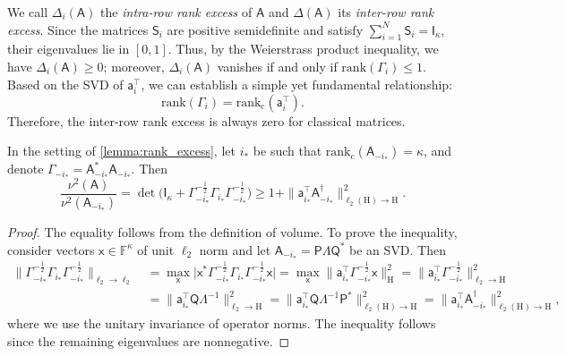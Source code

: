 \documentclass[onefignum,onetabnum]{siamart250211}
\renewenvironment{equation*}{\[}{\]\ignorespacesafterend}
\newcommand{\F}{\mathbb{F}}
\newcommand{\Hilb}{\mathrm{H}}
\newcommand{\Batrix}[1]{\bm{\Matrix{#1}}}
\newcommand{\Matrix}[1]{\mathsf{#1}}
\newcommand{\trans}{\intercal}
\newcommand{\pinv}{\dagger}
\newcommand{\rank}[2][]{\mathrm{rank} #1( #2 #1)}
\newcommand{\Rank}[3][]{\mathrm{rank_{#2}} #1( #3 #1)}
\newcommand{\Norm}[3][]{#1\| #2 #1\|_{\mathrm{#3}}}
\begin{document}
We call $\Delta_i(\Batrix{A})$ the \emph{intra-row rank excess} of $\Batrix{A}$ and $\Delta(\Batrix{A})$ its \emph{inter-row rank excess}.
Since the matrices $\Matrix{S}_i$ are positive semidefinite and satisfy $\sum_{i = 1}^{N} \Matrix{S}_i = \Matrix{I}_{\kappa}$, their eigenvalues lie in $[0, 1]$.
Thus, by the Weierstrass product inequality, we have $\Delta_i(\Batrix{A}) \geq 0$; moreover, $\Delta_i(\Batrix{A})$ vanishes if and only if $\rank{\Matrix{\Gamma}_i} \leq 1$.
Based on the SVD of $\Batrix{a}_i^\trans$, we can establish a simple yet fundamental relationship:
\begin{equation*}
    \rank{\Matrix{\Gamma}_i} = \Rank{c}{\Batrix{a}_i^\trans}.
\end{equation*}
Therefore, the inter-row rank excess is always zero for classical matrices.

\begin{lemma}
\label{lemma:vol_ratio_pinv_bound}
In the setting of \cref{lemma:rank_excess}, let $i_\ast$ be such that $\Rank{c}{\Batrix{A}_{-i_\ast}} = \kappa$, and denote $\Matrix{\Gamma}_{-i_\ast} = \Batrix{A}_{-i_\ast}^\ast \Batrix{A}_{-i_\ast}$.
Then
\begin{equation*}
    \frac{\nu^2(\Batrix{A})}{\nu^2(\Batrix{A}_{-i_\ast})} = \det\Big(\Matrix{I}_{\kappa} + \Matrix{\Gamma}_{-i_\ast}^{-\tfrac{1}{2}} \Matrix{\Gamma}_{i_\ast} \Matrix{\Gamma}_{-i_\ast}^{-\tfrac{1}{2}}\Big) \geq 1 + \Norm{\Batrix{a}_{i_\ast}^\trans \Batrix{A}_{-i_\ast}^{\pinv}}{\ell_2(\Hilb) \to \Hilb}^2.
\end{equation*}
\end{lemma}
\begin{proof}
The equality follows from the definition of volume.
To prove the inequality, consider vectors $\Matrix{x} \in \F^{\kappa}$ of unit $\ell_2$ norm and let $\Batrix{A}_{-i_\ast} = \Batrix{P} \Matrix{\Lambda} \Matrix{Q}^\ast$ be an SVD.
Then
\begin{align*}
    \Norm[\Big]{\Matrix{\Gamma}_{-i_\ast}^{-\tfrac{1}{2}} \Matrix{\Gamma}_{i_\ast} \Matrix{\Gamma}_{-i_\ast}^{-\tfrac{1}{2}}}{\ell_2 \to \ell_2} &= \max_{\Matrix{x}} \Big|
    \Matrix{x}^\ast \Matrix{\Gamma}_{-i_\ast}^{-\tfrac{1}{2}} \Matrix{\Gamma}_{i_\ast} \Matrix{\Gamma}_{-i_\ast}^{-\tfrac{1}{2}} \Matrix{x} \Big| = \max_{\Matrix{x}} \Norm[\Big]{\Batrix{a}_{i_\ast}^\trans \Matrix{\Gamma}_{-i_\ast}^{-\tfrac{1}{2}} \Matrix{x}}{\Hilb}^2 = \Norm[\Big]{\Batrix{a}_{i_\ast}^\trans \Matrix{\Gamma}_{-i_\ast}^{-\tfrac{1}{2}}}{\ell_2 \to \Hilb}^2 \\
    &= \Norm[\Big]{\Batrix{a}_{i_\ast}^\trans \Matrix{Q} \Matrix{\Lambda}^{-1}}{\ell_2 \to \Hilb}^2 = \Norm[\Big]{\Batrix{a}_{i_\ast}^\trans \Matrix{Q} \Matrix{\Lambda}^{-1} \Batrix{P}^\ast}{\ell_2(\Hilb) \to \Hilb}^2 = \Norm{\Batrix{a}_{i_\ast}^\trans \Batrix{A}_{-i_\ast}^{\pinv}}{\ell_2(\Hilb) \to \Hilb}^2,
\end{align*}
where we use the unitary invariance of operator norms.
The inequality follows since the remaining eigenvalues are nonnegative.
\end{proof}
\end{document}
